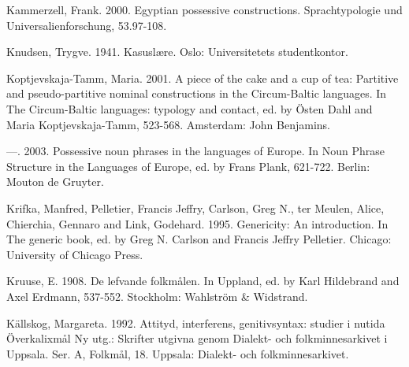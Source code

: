 \begin{styleBodytextC}
Kammerzell, Frank. 2000. Egyptian possessive constructions. Sprachtypologie und Universalienforschung, 53.97-108.

\end{styleBodytextC}

\begin{styleBodytextC}
Knudsen, Trygve. 1941. Kasuslære. Oslo: Universitetets studentkontor.

\end{styleBodytextC}

\begin{styleBodytextC}
Koptjevskaja-Tamm, Maria. 2001. {\textquotedbl}A piece of the cake{\textquotedbl} and {\textquotedbl}a cup of tea{\textquotedbl}: Partitive and pseudo-partitive nominal constructions in the Circum-Baltic languages. In The Circum-Baltic languages: typology and contact, ed. by Östen Dahl and Maria Koptjevskaja-Tamm, 523-568. Amsterdam: John Benjamins.

\end{styleBodytextC}

\begin{styleBodytextC}
—. 2003. Possessive noun phrases in the languages of Europe. In Noun Phrase Structure in the Languages of Europe, ed. by Frans Plank, 621-722. Berlin: Mouton de Gruyter.

\end{styleBodytextC}

\begin{styleBodytextC}
Krifka, Manfred, Pelletier, Francis Jeffry, Carlson, Greg N., ter Meulen, Alice, Chierchia, Gennaro and Link, Godehard. 1995. Genericity: An introduction. In The generic book, ed. by Greg N. Carlson and Francis Jeffry Pelletier. Chicago: University of Chicago Press.

\end{styleBodytextC}

\begin{styleBodytextC}
Kruuse, E.  1908. De lefvande folkmålen. In Uppland, ed. by Karl Hildebrand and Axel Erdmann, 537-552. Stockholm: Wahlström \& Widstrand.

\end{styleBodytextC}

\begin{styleBodytextC}
Källskog, Margareta. 1992. Attityd, interferens, genitivsyntax: studier i nutida Överkalixmål Ny utg.: Skrifter utgivna genom Dialekt- och folkminnesarkivet i Uppsala. Ser. A, Folkmål, 18. Uppsala: Dialekt- och folkminnesarkivet.

\end{styleBodytextC}

